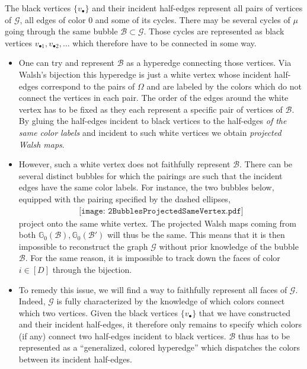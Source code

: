 \documentclass[aps,prd,10pt,notitlepage,nofootinbib,superscriptaddress,showkeys,showpacs]{revtex4-1}
\begin{document}
The black vertices $\{v_\bullet\}$ and their incident half-edges represent all pairs of vertices of ${\mathcal{G}}$, all edges of color 0 and some of its cycles. There may be several cycles of $\mu$ going through the same bubble ${\mathcal{B}}\subset {\mathcal{G}}$. Those cycles are represented as black vertices $v_{\bullet 1}, v_{\bullet 2}, \dotsc$ which therefore have to be connected in some way.
\begin{itemize}
\item One can try and represent ${\mathcal{B}}$ as a hyperedge connecting those vertices. Via Walsh's bijection \cite{Walsh} this hyperedge is just a white vertex whose incident half-edges correspond to the pairs of $\Omega$ and are labeled by the colors which do not connect the vertices in each pair. The order of the edges around the white vertex has to be fixed as they each represent a specific pair of vertices of ${\mathcal{B}}$. By gluing the half-edges incident to black vertices to the half-edges \emph{of the same color labels} and incident to such white vertices we obtain \emph{projected Walsh maps}.

\item However, such a white vertex does not faithfully represent ${\mathcal{B}}$. There can be several distinct bubbles for which the pairings are such that the incident edges have the same color labels. For instance, the two bubbles below, equipped with the pairing specified by the dashed ellipses,
\begin{equation}
\begin{array}{c} \texttt{[image: 2BubblesProjectedSameVertex.pdf]}
\end{array}
\end{equation}
project onto the same white vertex. The projected Walsh maps coming from both ${\mathbb{G}}_0({\mathcal{B}}), {\mathbb{G}}_0({\mathcal{B}}')$ will thus be the same. This means that it is then impossible to reconstruct the graph ${\mathcal{G}}$ without prior knowledge of the bubble ${\mathcal{B}}$. For the same reason, it is impossible to track down the faces of color $i\in[D]$ through the bijection.

\item To remedy this issue, we will find a way to faithfully represent all faces of ${\mathcal{G}}$. Indeed, ${\mathcal{G}}$ is fully characterized by the knowledge of which colors connect which two vertices. Given the black vertices $\{v_\bullet\}$ that we have constructed and their incident half-edges, it therefore only remains to specify which colors (if any) connect two half-edges incident to black vertices. ${\mathcal{B}}$ thus has to be represented as a \enquote{generalized, colored hyperedge} which dispatches the colors between its incident half-edges.
\end{itemize}
\end{document}
